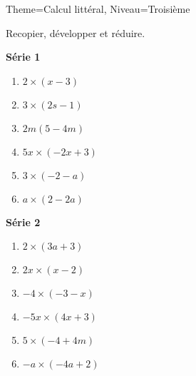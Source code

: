\documentclass[11pt]{article}
\begin{document}
\begin{multicols}{2}
\begin{Maquette}[Fiche]{Theme=Calcul littéral, Niveau=Troisième}
        \begin{exercice}
            Recopier, développer et réduire.
            \begin{multicols}{2}
                \textbf{Série 1}
                \begin{enumerate}[label=\textbf{\alph*.}]
                    \item $ 2 \times \left( x-3 \right) $
                    \item $ 3 \times \left( 2s-1 \right) $
                    \item $ 2m \left( 5-4m \right) $
                    \item $ 5x \times \left( -2x+3 \right) $
                    \item $ 3 \times \left( -2-a \right) $
                    \item $ a \times \left( 2-2a \right) $
                \end{enumerate}
                \textbf{Série 2}
                \begin{enumerate}[label=\textbf{\alph*.}]
                    \item $ 2 \times \left( 3a+3 \right) $
                    \item $ 2x \times \left( x-2 \right) $
                    \item $ -4 \times \left( -3-x \right) $
                    \item $ -5x \times \left( 4x+3 \right) $
                    \item $ 5 \times \left( -4+4m \right) $
                    \item $ -a \times \left( -4a+2 \right) $
                \end{enumerate}
            \end{multicols}
        \end{exercice}
    \end{Maquette}

\end{multicols}
\end{document}
